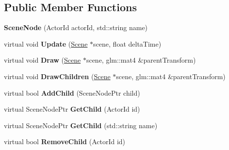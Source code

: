 \subsection*{Public Member Functions}
\begin{DoxyCompactItemize}
\item 
\mbox{\label{classTarbora_1_1SceneNode_a69d809d7aa57507a26083f55d7db3b40}} 
{\bfseries Scene\+Node} (Actor\+Id actor\+Id, std\+::string name)
\item 
\mbox{\label{classTarbora_1_1SceneNode_aa632d88ac3e509bed916c1ecf0264768}} 
virtual void {\bfseries Update} (\hyperlink{classTarbora_1_1Scene}{Scene} $\ast$scene, float delta\+Time)
\item 
\mbox{\label{classTarbora_1_1SceneNode_aff5dabdf9d6e3a022c44612f24ec9cd4}} 
virtual void {\bfseries Draw} (\hyperlink{classTarbora_1_1Scene}{Scene} $\ast$scene, glm\+::mat4 \&parent\+Transform)
\item 
\mbox{\label{classTarbora_1_1SceneNode_a47380e8ad0072db88e097771ee47bd78}} 
virtual void {\bfseries Draw\+Children} (\hyperlink{classTarbora_1_1Scene}{Scene} $\ast$scene, glm\+::mat4 \&parent\+Transform)
\item 
\mbox{\label{classTarbora_1_1SceneNode_a67018d89636c37f1b5eeae83c03176e2}} 
virtual bool {\bfseries Add\+Child} (Scene\+Node\+Ptr child)
\item 
\mbox{\label{classTarbora_1_1SceneNode_ae26162bcafa1831787d9adca31bb3f87}} 
virtual Scene\+Node\+Ptr {\bfseries Get\+Child} (Actor\+Id id)
\item 
\mbox{\label{classTarbora_1_1SceneNode_a43833185ef55584ef8e9c5a82aac2f16}} 
virtual Scene\+Node\+Ptr {\bfseries Get\+Child} (std\+::string name)
\item 
\mbox{\label{classTarbora_1_1SceneNode_a096510db96d082b343120f3975933f90}} 
virtual bool {\bfseries Remove\+Child} (Actor\+Id id)
\item 
\mbox{\label{classTarbora_1_1SceneNode_ad5939b9062f6235530aeb71a4df43300}} 

\end{DoxyCompactItemize}
